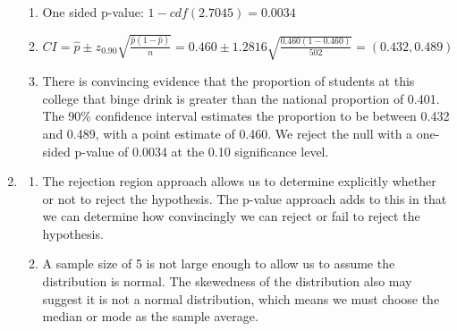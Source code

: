 \documentclass[12pt,letterpaper]{article}
\begin{document}
\begin{enumerate}
\begin{enumerate}
      \item One sided p-value: $1-cdf(2.7045) = \boxed{0.0034}$

      \item $CI = \hat{p} \pm z_{0.90}\sqrt{\frac{\hat{p}(1-\hat{p})}{n}} = 0.460 \pm 1.2816\sqrt{\frac{0.460(1-0.460)}{502}} = \boxed{(0.432, 0.489)}$

      \item There is convincing evidence that the proportion of students at
        this college that binge drink is greater than the national proportion
        of 0.401. The 90\% confidence interval estimates the proportion to be
        between 0.432 and 0.489, with a point estimate of 0.460. We reject the
        null with a one-sided p-value of 0.0034 at the 0.10 significance level.
    \end{enumerate}

  \item
    \begin{enumerate}
      \item The rejection region approach allows us to determine explicitly
        whether or not to reject the hypothesis. The p-value approach adds to
        this in that we can determine how convincingly we can reject or fail to
        reject the hypothesis.

      \item A sample size of 5 is not large enough to allow us to assume the
        distribution is normal. The skewedness of the distribution also may
        suggest it is not a normal distribution, which means we must choose the
        median or mode as the sample average.
    \end{enumerate}
\end{enumerate}
\end{document}
